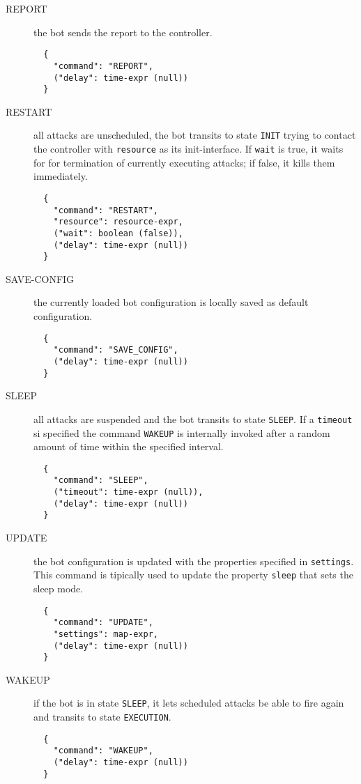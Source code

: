 \begin{description}
  \item[REPORT] the bot sends the report to the controller.

  \begin{verbatim}
  {
    "command": "REPORT",
    ("delay": time-expr (null))
  }
  \end{verbatim}

  \item[RESTART] all attacks are unscheduled, the bot transits to state \texttt{INIT} trying to contact the controller with \texttt{resource} as its init-interface.
  If \texttt{wait} is true, it waits for for termination of currently executing attacks; if false, it kills them immediately.

  \begin{verbatim}
  {
    "command": "RESTART",
    "resource": resource-expr,
    ("wait": boolean (false)),
    ("delay": time-expr (null))
  }
  \end{verbatim}

  \item[SAVE-CONFIG] the currently loaded bot configuration is locally saved as default configuration.

  \begin{verbatim}
  {
    "command": "SAVE_CONFIG",
    ("delay": time-expr (null))
  }
  \end{verbatim}

  \item[SLEEP] all attacks are suspended and the bot transits to state \texttt{SLEEP}. If a \texttt{timeout} si specified the command \texttt{WAKEUP} is internally invoked after a random amount of time within the specified interval.

  \begin{verbatim}
  {
    "command": "SLEEP",
    ("timeout": time-expr (null)),
    ("delay": time-expr (null))
  }
  \end{verbatim}

  \item[UPDATE] the bot configuration is updated with the properties specified in \texttt{settings}. This command is tipically used to update the property \texttt{sleep} that sets the sleep mode.

  \begin{verbatim}
  {
    "command": "UPDATE",
    "settings": map-expr,
    ("delay": time-expr (null))
  }
  \end{verbatim}

  \item[WAKEUP] if the bot is in state \texttt{SLEEP}, it lets scheduled attacks be able to fire again and transits to state \texttt{EXECUTION}.

  \begin{verbatim}
  {
    "command": "WAKEUP",
    ("delay": time-expr (null))
  }
  \end{verbatim}

\end{description}
